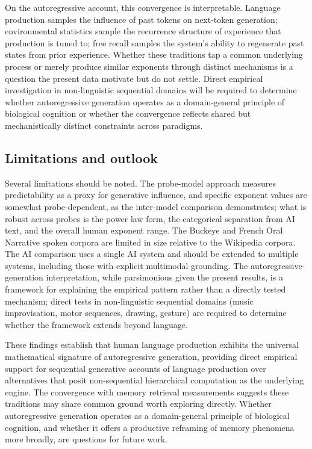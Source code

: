 \documentclass[9pt,twocolumn,twoside]{pnas-new}
\begin{document}
On the autoregressive account, this convergence is interpretable. Language production samples the influence of past tokens on next-token generation; environmental statistics sample the recurrence structure of experience that production is tuned to; free recall samples the system's ability to regenerate past states from prior experience. Whether these traditions tap a common underlying process or merely produce similar exponents through distinct mechanisms is a question the present data motivate but do not settle. Direct empirical investigation in non-linguistic sequential domains will be required to determine whether autoregressive generation operates as a domain-general principle of biological cognition or whether the convergence reflects shared but mechanistically distinct constraints across paradigms.

\subsection*{Limitations and outlook}

Several limitations should be noted. The probe-model approach measures predictability as a proxy for generative influence, and specific exponent values are somewhat probe-dependent, as the inter-model comparison demonstrates; what is robust across probes is the power law form, the categorical separation from AI text, and the overall human exponent range. The Buckeye and French Oral Narrative spoken corpora are limited in size relative to the Wikipedia corpora. The AI comparison uses a single AI system and should be extended to multiple systems, including those with explicit multimodal grounding. The autoregressive-generation interpretation, while parsimonious given the present results, is a framework for explaining the empirical pattern rather than a directly tested mechanism; direct tests in non-linguistic sequential domains (music improvisation, motor sequences, drawing, gesture) are required to determine whether the framework extends beyond language.

These findings establish that human language production exhibits the universal mathematical signature of autoregressive generation, providing direct empirical support for sequential generative accounts of language production over alternatives that posit non-sequential hierarchical computation as the underlying engine. The convergence with memory retrieval measurements suggests these traditions may share common ground worth exploring directly. Whether autoregressive generation operates as a domain-general principle of biological cognition, and whether it offers a productive reframing of memory phenomena more broadly, are questions for future work.
\end{document}
